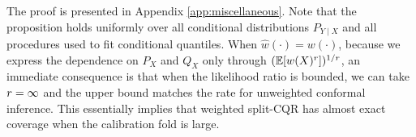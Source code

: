 The proof is presented in Appendix \ref{app:miscellaneous}. Note that the proposition holds uniformly over all conditional
 distributions $P_{Y\mid X}$ and all procedures used to fit
 conditional quantiles. When $\hat{w}(\cdot) = w(\cdot)$, because we express the dependence on $P_{X}$
 and $Q_{X}$ only through $(\mathbb{E}[w(X)^{r}])^{1/r}$, an immediate consequence
 is that when the likelihood ratio is bounded, we can take
 $r = \infty$ and the upper bound matches the rate for unweighted
 conformal inference. This essentially implies that weighted split-CQR
 has almost exact coverage when the calibration fold is large.


